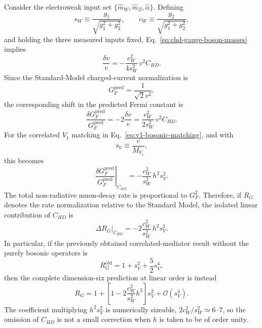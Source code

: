Consider the electroweak input set
$\{\widehat m_W,\widehat m_Z,\widehat\alpha\}$.  Defining
\begin{equation}
    s_W\equiv\frac{g_1}{\sqrt{g_1^2+g_2^2}},
    \qquad
    c_W\equiv\frac{g_2}{\sqrt{g_1^2+g_2^2}},
\end{equation}
and holding the three measured inputs fixed, Eq.~\eqref{eq:chd-gauge-boson-masses}
implies
\begin{equation}
    \frac{\delta v}{v}
    =-\frac{c_W^2}{4s_W^2}\,v^2C_{HD}.
    \label{eq:chd-vev-shift}
\end{equation}
Since the Standard-Model charged-current normalization is
\begin{equation}
    G_F^{\mathrm{pred}}=\frac{1}{\sqrt2v^2},
\end{equation}
the corresponding shift in the predicted Fermi constant is
\begin{equation}
    \frac{\delta G_F^{\mathrm{pred}}}{G_F^{\mathrm{pred}}}
    =-2\frac{\delta v}{v}
    =\frac{c_W^2}{2s_W^2}\,v^2C_{HD}.
    \label{eq:chd-gf-shift}
\end{equation}
For the correlated $V_1$ matching in
Eq.~\eqref{eq:v1-bosonic-matching}, and with
\begin{equation}
    s_V\equiv\frac{v}{M_{V_1}},
\end{equation}
this becomes
\begin{equation}
    \left.
    \frac{\delta G_F^{\mathrm{pred}}}{G_F^{\mathrm{pred}}}
    \right|_{C_{HD}}
    =-\frac{c_W^2}{s_W^2}\,h^2s_V^2.
    \label{eq:v1-chd-gf-shift}
\end{equation}
The total non-radiative muon-decay rate is proportional to $G_F^2$.
Therefore, if $R_G$ denotes the rate normalization relative to the
Standard Model, the isolated linear contribution of $C_{HD}$ is
\begin{equation}
    \left.\Delta R_G\right|_{C_{HD}}
    =-2\frac{c_W^2}{s_W^2}\,h^2s_V^2.
    \label{eq:v1-chd-rate-shift}
\end{equation}
In particular, if the previously obtained correlated-mediator result
without the purely bosonic operators is
\begin{equation}
    R_G^{\mathrm{old}}
    =1+s_V^2+\frac52s_V^4,
\end{equation}
then the complete dimension-six prediction at linear order is instead
\begin{equation}
    R_G
    =1+
      \left[
          1-2\frac{c_W^2}{s_W^2}h^2
      \right]s_V^2
      +\mathcal O(s_V^4).
    \label{eq:v1-rate-with-chd}
\end{equation}
The coefficient multiplying $h^2s_V^2$ is numerically sizeable,
$2c_W^2/s_W^2\simeq6\text{--}7$, so the omission of $C_{HD}$ is not a
small correction when $h$ is taken to be of order unity.

